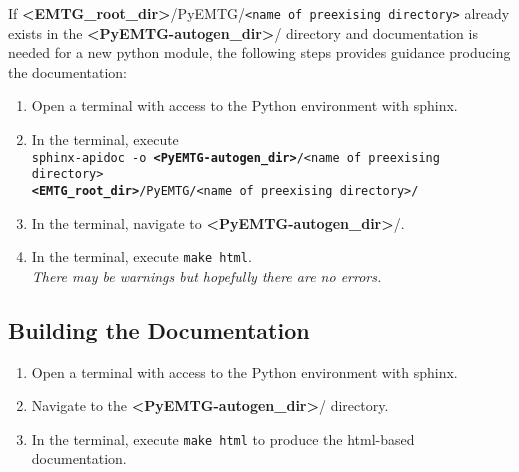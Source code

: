 \documentclass[11pt]{article}
\begin{document}
\noindent If \textbf{\textless EMTG\_root\_dir\textgreater}/PyEMTG/\texttt{<name of preexising directory>} already exists in the \textbf{\textless PyEMTG-autogen\_dir\textgreater}/ directory and documentation is needed for a new python module, the following steps provides guidance producing the documentation:
\begin{enumerate}
	\item Open a terminal with access to the Python environment with sphinx.
	\item In the terminal, execute \\ \texttt{sphinx-apidoc -o \textbf{\textless PyEMTG-autogen\_dir\textgreater}/<name of preexising directory> \\ \textbf{\textless EMTG\_root\_dir\textgreater}/PyEMTG/<name of preexising directory>/}
	\item In the terminal, navigate to \textbf{\textless PyEMTG-autogen\_dir\textgreater}/.
	\item In the terminal, execute \texttt{make html}. \\ \textit{There may be warnings but hopefully there are no errors.}
\end{enumerate}

\subsection{Building the Documentation}
\label{sec:building_rst_documentation}

\begin{enumerate}
	\item Open a terminal with access to the Python environment with sphinx.
	\item Navigate to the \textbf{\textless PyEMTG-autogen\_dir\textgreater}/ directory.
	\item In the terminal, execute \texttt{make html} to produce the html-based documentation.
\end{enumerate}
\end{document}
